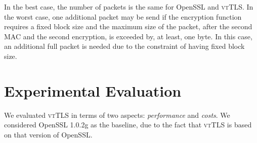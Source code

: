 \documentclass{sig-alternate-05-2015}
\begin{document}


In the best case, the number of packets is the same for OpenSSL and \textsc{vtTLS}. In the worst case, one additional packet may be send if the encryption function requires a fixed block size and the maximum size of the packet, after the second MAC and the second encryption, is exceeded by, at least, one byte. In this case, an additional full packet is needed due to the constraint of having fixed block size.





\section{Experimental Evaluation}
\label{sec-evaluation}


We evaluated \textsc{vtTLS} in terms of two aspects: \textit{performance} and \textit{costs}.
We considered OpenSSL 1.0.2g as the baseline, due to the fact that \textsc{vtTLS} is based on that version of OpenSSL.
\end{document}
